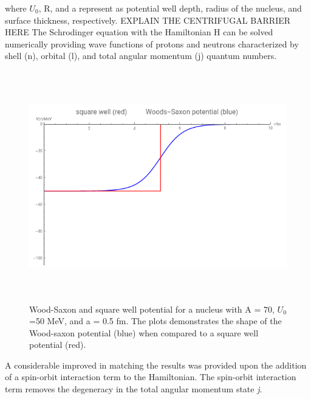 \documentclass[a4paper,12pt,twoside]{report}
\begin{document}
where $U_{0}$, R, and a represent as potential well depth, radius of the nucleus, and surface thickness, respectively.
EXPLAIN THE CENTRIFUGAL BARRIER HERE
The Schrodinger equation with the Hamiltonian H can be solved numerically providing wave functions of protons and neutrons characterized by shell (n), orbital (l), and total angular momentum (j) quantum numbers.


\begin{figure}[h!]
    \centering
    \includegraphics[width=12cm,height=10cm]{Wood_sxaon.png}
    \caption[Wood-Saxon and square well potential for a nucleus with A = 70, $U_{0}$=50 MeV, and a = 0.5 fm.]{Wood-Saxon and square well potential for a nucleus with A = 70, $U_{0}$=50 MeV, and a = 0.5 fm. The plots demonstrates the shape of the Wood-saxon potential (blue) when compared to a square well potential (red). }
    \label{fig:woods_saxon}
\end{figure}
 A considerable improved in matching the results was provided upon the addition of a spin-orbit interaction term to the Hamiltonian. The spin-orbit interaction term removes the degeneracy in the total angular momentum state \textit{j}. 
 
\end{document}
